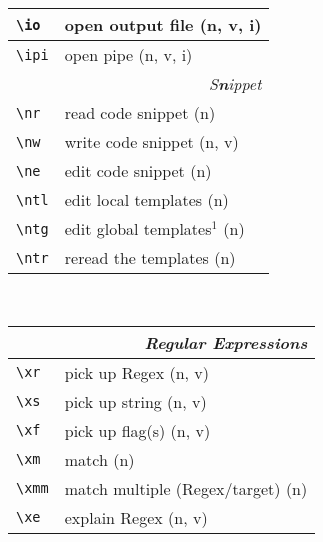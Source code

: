 \documentclass[oneside,10pt,landscape,DIV17]{scrartcl}
\begin{document}
\begin{multicols}{3}
\begin{center}
\begin{tabular}[]{|p{18mm}|p{49mm}|}
\hline \verb'\io'  & open output file          \hfill (n, v, i)\\
\hline \verb'\ipi' & open pipe                 \hfill (n, v, i)\\
\hline
\hline
\multicolumn{2}{|r|}{\textsl{S\textbf{n}ippet}}             \\[1.0ex]
\hline \verb'\nr'  & read code snippet         \hfill (n)   \\
\hline \verb'\nw'  & write code snippet        \hfill (n, v)\\
\hline \verb'\ne'  & edit code snippet         \hfill (n)   \\
%
\hline \verb'\ntl' & edit local templates      \hfill (n)   \\
\hline \verb'\ntg' & edit global templates$^1$ \hfill (n)   \\
\hline \verb'\ntr' & reread the templates      \hfill (n)   \\
\hline
\end{tabular}\\
%
%
\begin{tabular}[]{|p{11mm}|p{58mm}|}
\hline
\multicolumn{2}{|r|}{\textsl{Regular E\textbf{x}pressions}}     \\[1.0ex]
\hline \verb'\xr' &  pick up Regex                 \hfill (n, v)\\
\hline \verb'\xs' &  pick up string                \hfill (n, v)\\
\hline \verb'\xf' &  pick up flag(s)               \hfill (n, v)\\
\hline \verb'\xm' &  match                         \hfill (n)   \\
\hline \verb'\xmm'&  match multiple (Regex/target) \hfill (n)   \\
\hline \verb'\xe' &  explain Regex                 \hfill (n, v)\\
\hline

\end{tabular}
\end{center}
\end{multicols}
\end{document}
